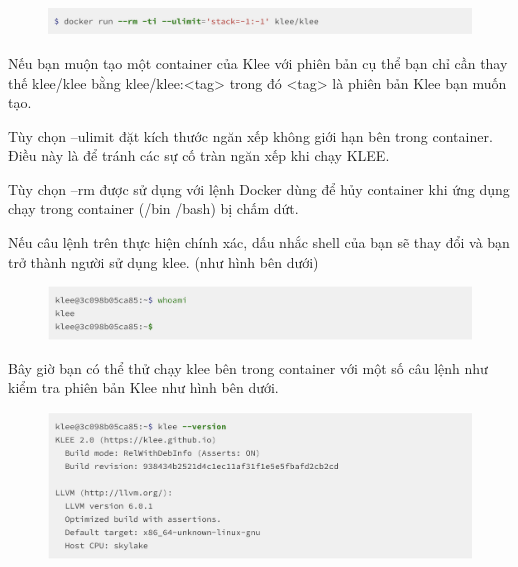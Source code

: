 \documentclass[12pt,a4paper]{article}
\begin{document}
\begin{itemize}
\begin{figure}[t]
\begin{center}
\includegraphics[scale=0.3]{hinhanh/kleecontainer.png}
\end{center}
\end{figure}

Nếu bạn muộn tạo một container của Klee với phiên bản cụ thể bạn chỉ cần thay thế klee/klee bằng klee/klee:<tag> trong đó <tag> là phiên bản Klee bạn muốn tạo.

Tùy chọn --ulimit đặt kích thước ngăn xếp không giới hạn bên trong container. Điều này là để tránh các sự cố tràn ngăn xếp khi chạy KLEE.

Tùy chọn --rm được sử dụng với lệnh Docker dùng để hủy container khi ứng dụng chạy trong container (/bin /bash) bị chấm dứt. 

Nếu câu lệnh trên thực hiện chính xác, dấu nhắc shell của bạn sẽ thay đổi và bạn trở thành người sử dụng klee. (như hình bên dưới)

\begin{figure}[ht]
\begin{center}
\includegraphics[scale=.3]{hinhanh/shellcontainerklee.png}
\end{center}
\end{figure}

Bây giờ bạn có thể thử chạy klee bên trong container với một số câu lệnh  như kiểm tra phiên bản Klee như hình bên dưới.

\begin{figure}[ht]
\begin{center}
\includegraphics[scale=0.3]{hinhanh/kleeversion.png}
\end{center}
\end{figure}


\end{itemize}
\end{document}
